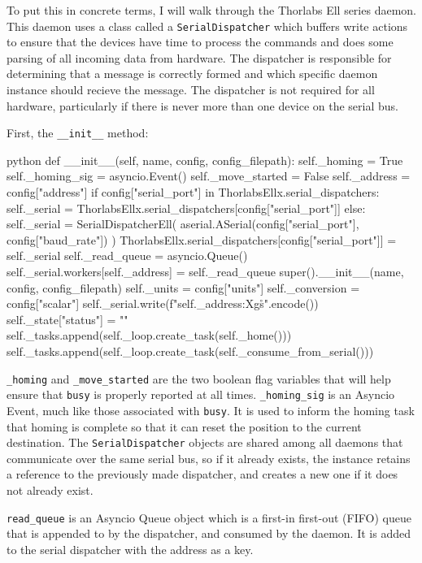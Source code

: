 To put this in concrete terms, I will walk through the Thorlabs Ell series daemon.
This daemon uses a class called a \texttt{SerialDispatcher} which buffers write actions to ensure that the devices have time to process the commands and does some parsing of all incoming data from hardware.
The dispatcher is responsible for determining that a message is correctly formed and which specific daemon instance should recieve the message.
The dispatcher is not required for all hardware, particularly if there is never more than one device on the serial bus.

First, the \texttt{\_\_init\_\_} method:

\begin{codefragment}{python}
def __init__(self, name, config, config_filepath):
    self._homing = True
    self._homing_sig = asyncio.Event()
    self._move_started = False
    self._address = config["address"]
    if config["serial_port"] in ThorlabsEllx.serial_dispatchers:
        self._serial = ThorlabsEllx.serial_dispatchers[config["serial_port"]]
    else:
        self._serial = SerialDispatcherEll(
            aserial.ASerial(config["serial_port"], config["baud_rate"])
        )
        ThorlabsEllx.serial_dispatchers[config["serial_port"]] = self._serial
    self._read_queue = asyncio.Queue()
    self._serial.workers[self._address] = self._read_queue
    super().__init__(name, config, config_filepath)
    self._units = config["units"]
    self._conversion = config["scalar"]
    self._serial.write(f"{self._address:X}gs\r\n".encode())
    self._state["status"] = ""
    self._tasks.append(self._loop.create_task(self._home()))
    self._tasks.append(self._loop.create_task(self._consume_from_serial()))
\end{codefragment}

\texttt{\_homing} and \texttt{\_move\_started} are the two boolean flag variables that will help ensure that \texttt{busy} is properly reported at all times.
\texttt{\_homing\_sig} is an Asyncio Event, much like those associated with \texttt{busy}.
It is used to inform the homing task that homing is complete so that it can reset the position to the current destination.
The \texttt{SerialDispatcher} objects are shared among all daemons that communicate over the same serial bus, so if it already exists, the instance retains a reference to the previously made dispatcher, and creates a new one if it does not already exist.

\texttt{read\_queue} is an Asyncio Queue\cite{} object which is a first-in first-out (FIFO) queue that is appended to by the dispatcher, and consumed by the daemon.
It is added to the serial dispatcher with the address as a key.

